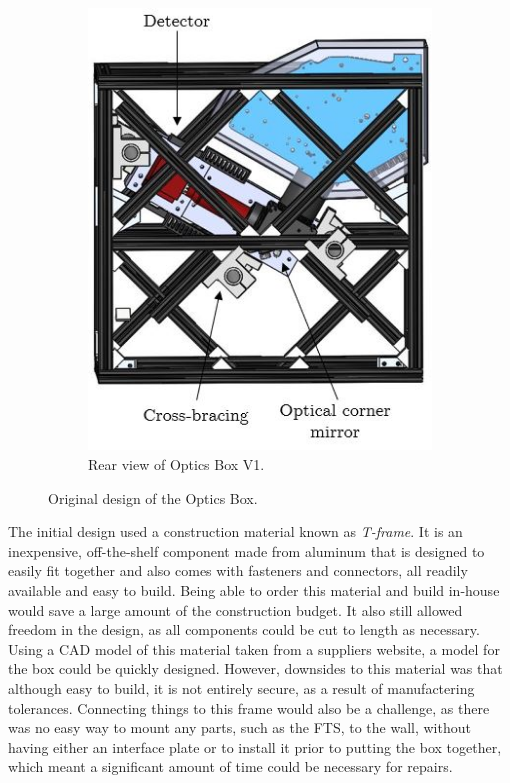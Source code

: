 \begin{figure}
\begin{subfigure}[h]{0.42\textwidth}
        \includegraphics[width=\textwidth]{chap3_images/LIFE_V1_images/Optics_Box_V1_V0_rear_view_labelled.JPG}
        \caption{Rear view of Optics Box V1.}
        \label{fig:OB_V1_rear}
    \end{subfigure}
    \caption{Original design of the Optics Box.}
    \label{fig:OB_V1}
\end{figure}

The initial design used a construction material known as \textit{T-frame}. It is an inexpensive, off-the-shelf component made from aluminum that is designed to easily fit together and also comes with fasteners and connectors, all readily available and easy to build. Being able to order this material and build in-house would save a large amount of the construction budget. It also still allowed freedom in the design, as all components could be cut to length as necessary. Using a CAD model of this material taken from a suppliers website, a model for the box could be quickly designed. However, downsides to this material was that although easy to build, it is not entirely secure, as a result of manufactering tolerances. Connecting things to this frame would also be a challenge, as there was no easy way to mount any parts, such as the FTS, to the wall, without having either an interface plate or to install it prior to putting the box together, which meant a significant amount of time could be necessary for repairs.

